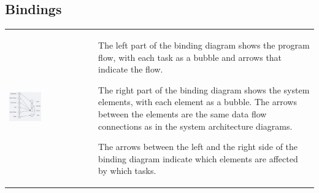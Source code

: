 	\subsection{Bindings}
		\begin{tabular}{p{}p{}}
			\vspace{0pt}
			
			\includegraphics[width=0.4\textwidth]{./pictures/bindings.png}
			&
			\begin{compactitem}
			  \item The left part of the binding diagram shows the program flow, with each task as a bubble and arrows that indicate the flow. 
			  \item The right part of the binding diagram shows the system elements, with each element as a bubble. The arrows between the elements are the same data flow connections as in the system architecture diagrams.
			  \item The arrows between the left and the right side of the binding diagram indicate which elements are affected by which tasks.
			\end{compactitem}	\\	
		\end{tabular}